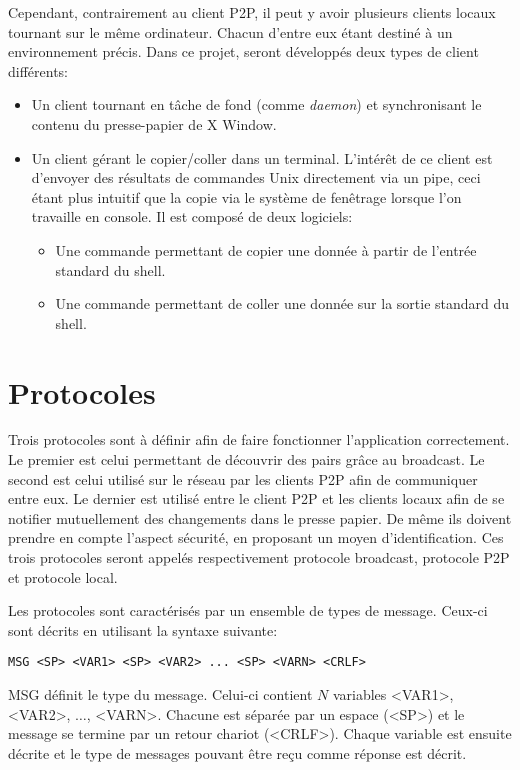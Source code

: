 Cependant, contrairement au client P2P, il peut y avoir plusieurs clients
locaux tournant sur le même ordinateur. Chacun d'entre eux étant destiné
à un environnement précis. Dans ce projet, seront développés deux types
de client différents:
\begin{itemize}
\item Un client tournant en tâche de fond (comme \emph{daemon}) et
  synchronisant le contenu du presse-papier de X Window.
\item Un client gérant le copier/coller dans un terminal. L'intérêt de ce
  client est d'envoyer des résultats de commandes Unix directement via
  un pipe, ceci étant plus intuitif que la copie via le système de fenêtrage
  lorsque l'on travaille en console.
  Il est composé de deux logiciels:
  \begin{itemize}
  \item Une commande permettant de copier une donnée à partir de l'entrée
    standard du shell.
  \item Une commande permettant de coller une donnée sur la sortie standard
    du shell.
  \end{itemize}
\end{itemize}

\section{Protocoles}
Trois protocoles sont à définir afin de faire fonctionner l'application
correctement. Le premier est celui permettant de découvrir des pairs grâce au
broadcast. Le second est celui utilisé sur le réseau par les clients
P2P afin de communiquer entre eux. Le dernier est utilisé entre le client
P2P et les clients locaux afin de se notifier mutuellement des changements
dans le presse papier. De même ils doivent prendre en compte
l'aspect sécurité, en proposant un moyen d'identification.
Ces trois protocoles seront appelés respectivement protocole broadcast,
protocole P2P et protocole local.

Les protocoles sont caractérisés par un ensemble de types de message.
Ceux-ci sont décrits en utilisant la syntaxe suivante:
\begin{verbatim}
MSG <SP> <VAR1> <SP> <VAR2> ... <SP> <VARN> <CRLF>
\end{verbatim}
MSG définit le type du message. Celui-ci contient $N$ va\-ria\-bles
<VAR1>, <VAR2>, $\ldots$, <VARN>. Chacune est séparée par un espace (<SP>)
et le message se termine par un retour chariot (<CRLF>). Chaque variable est
ensuite décrite et le type de messages pouvant être reçu comme réponse est
décrit.

